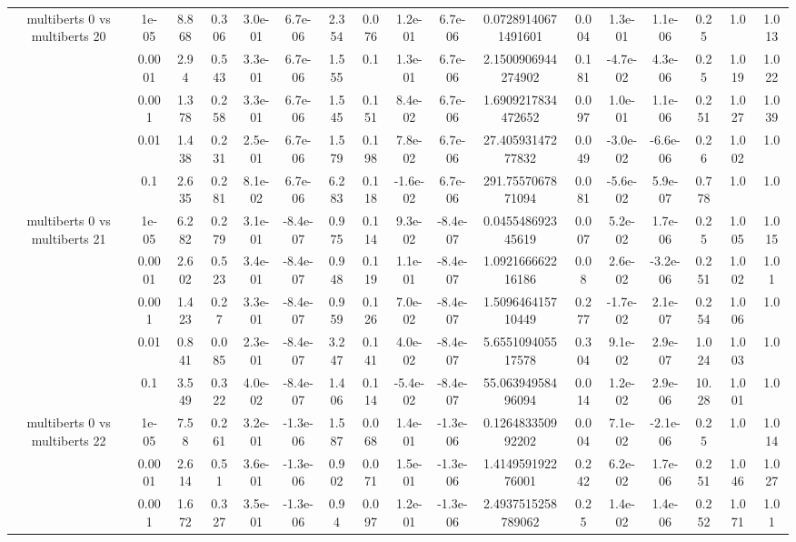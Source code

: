 \begin{tabular}{|c|c|c|c|c|c|c|c|c|c|c|c|c|c|c|c|c|}
\hline
\multirow{5}{*}{multiberts 0 vs multiberts 20} & 1e-05 & 8.868 & 0.306 & 3.0e-01 & 6.7e-06 & 2.354 & 0.076 & 1.2e-01 & 6.7e-06 & 0.07289140671491601 & 0.004 & 1.3e-01 & 1.1e-06 & 0.25 & 1.0 & 1.013 \\
 & 0.0001 & 2.94 & 0.543 & 3.3e-01 & 6.7e-06 & 1.555 & 0.1 & 1.3e-01 & 6.7e-06 & 2.1500906944274902 & 0.181 & -4.7e-02 & 4.3e-06 & 0.25 & 1.019 & 1.022 \\
 & 0.001 & 1.378 & 0.258 & 3.3e-01 & 6.7e-06 & 1.545 & 0.151 & 8.4e-02 & 6.7e-06 & 1.6909217834472652 & 0.097 & 1.0e-01 & 1.1e-06 & 0.251 & 1.027 & 1.039 \\
 & 0.01 & 1.438 & 0.231 & 2.5e-01 & 6.7e-06 & 1.579 & 0.198 & 7.8e-02 & 6.7e-06 & 27.40593147277832 & 0.049 & -3.0e-02 & -6.6e-06 & 0.26 & 1.002 & 1.0 \\
 & 0.1 & 2.635 & 0.281 & 8.1e-02 & 6.7e-06 & 6.283 & 0.118 & -1.6e-02 & 6.7e-06 & 291.7557067871094 & 0.081 & -5.6e-02 & 5.9e-07 & 0.778 & 1.0 & 1.0 \\
\hline
\multirow{5}{*}{multiberts 0 vs multiberts 21} & 1e-05 & 6.282 & 0.279 & 3.1e-01 & -8.4e-07 & 0.975 & 0.114 & 9.3e-02 & -8.4e-07 & 0.045548692345619 & 0.007 & 5.2e-02 & 1.7e-06 & 0.25 & 1.005 & 1.015 \\
 & 0.0001 & 2.602 & 0.523 & 3.4e-01 & -8.4e-07 & 0.948 & 0.119 & 1.1e-01 & -8.4e-07 & 1.092166662216186 & 0.08 & 2.6e-02 & -3.2e-06 & 0.251 & 1.002 & 1.01 \\
 & 0.001 & 1.423 & 0.27 & 3.3e-01 & -8.4e-07 & 0.959 & 0.126 & 7.0e-02 & -8.4e-07 & 1.509646415710449 & 0.277 & -1.7e-02 & 2.1e-07 & 0.254 & 1.006 & 1.0 \\
 & 0.01 & 0.841 & 0.085 & 2.3e-01 & -8.4e-07 & 3.247 & 0.141 & 4.0e-02 & -8.4e-07 & 5.655109405517578 & 0.304 & 9.1e-02 & 2.9e-07 & 1.024 & 1.003 & 1.0 \\
 & 0.1 & 3.549 & 0.322 & 4.0e-02 & -8.4e-07 & 1.406 & 0.114 & -5.4e-02 & -8.4e-07 & 55.06394958496094 & 0.014 & 1.2e-02 & 2.9e-06 & 10.28 & 1.001 & 1.0 \\
\hline
\multirow{5}{*}{multiberts 0 vs multiberts 22} & 1e-05 & 7.58 & 0.261 & 3.2e-01 & -1.3e-06 & 1.587 & 0.068 & 1.4e-01 & -1.3e-06 & 0.126483350992202 & 0.004 & 7.1e-02 & -2.1e-06 & 0.25 & 1.0 & 1.014 \\
 & 0.0001 & 2.614 & 0.51 & 3.6e-01 & -1.3e-06 & 0.902 & 0.071 & 1.5e-01 & -1.3e-06 & 1.414959192276001 & 0.242 & 6.2e-02 & 1.7e-06 & 0.251 & 1.046 & 1.027 \\
 & 0.001 & 1.672 & 0.327 & 3.5e-01 & -1.3e-06 & 0.94 & 0.097 & 1.2e-01 & -1.3e-06 & 2.4937515258789062 & 0.25 & 1.4e-02 & 1.4e-06 & 0.252 & 1.071 & 1.01 \\

\end{tabular}
